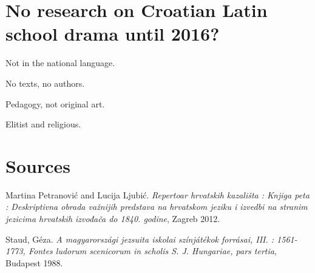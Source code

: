 \documentclass[14pt]{beamer}
\begin{document}
{
    \begin{frame}[plain]
    \end{frame}
    }



\section{No research on Croatian Latin school drama until 2016?}


\begin{frame}[standout]

Not in the national language.

No texts, no authors.

Pedagogy, not original art.

Elitist and religious.

\end{frame}

\section{Sources}

\begin{frame}

Martina Petranović and Lucija Ljubić. \emph{Repertoar hrvatskih kazališta : Knjiga peta : Deskriptivna obrada važnijih predstava na hrvatskom jeziku i izvedbi na stranim jezicima hrvatskih izvođača do 1840. godine}, Zagreb 2012.

Staud, Géza. \emph{A magyarországi jezsuita iskolai színjátékok forrásai, III. : 1561-1773, Fontes ludorum scenicorum in scholis S. J. Hungariae, pars tertia}, Budapest 1988.

\end{frame}
\end{document}
